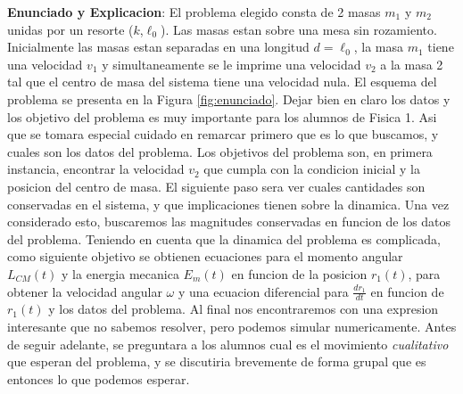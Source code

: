 \documentclass[12pt,a4paper]{article}
\begin{document}
\textbf{Enunciado y Explicacion}: El problema elegido consta de 2 masas $m_1$ y $m_2$ unidas por un resorte ($k$,$\ell_0$). Las masas estan sobre una mesa sin rozamiento. Inicialmente las masas estan separadas en una longitud $d=\ell_0$, la masa $m_1$ tiene una velocidad $v_1$ y simultaneamente se le imprime una velocidad $v_2$ a la masa 2 tal que el centro de masa del sistema tiene una velocidad nula. El esquema del problema se presenta en la Figura \ref{fig:enunciado}. Dejar bien en claro los datos y los objetivo del problema es muy importante para los alumnos de Fisica 1. Asi que se tomara especial cuidado en remarcar primero que es lo que buscamos, y cuales son los datos del problema. Los objetivos del problema son, en primera instancia, encontrar la velocidad $v_2$ que cumpla con la condicion inicial y la posicion del centro de masa. El siguiente paso sera ver cuales cantidades son conservadas en el sistema, y que implicaciones tienen sobre la dinamica. Una vez considerado esto, buscaremos las magnitudes conservadas en funcion de los datos del problema. Teniendo en cuenta que la dinamica del problema es complicada, como siguiente objetivo se obtienen ecuaciones para el momento angular $L_{CM}(t)$ y la energia mecanica $E_m(t)$ en funcion de la posicion $r_1(t)$, para obtener la velocidad angular $\omega$ y una ecuacion diferencial para $\frac{dr_1}{dt}$ en funcion de $r_1(t)$ y los datos del problema. Al final nos encontraremos con una expresion interesante que no sabemos resolver, pero podemos simular numericamente.
Antes de seguir adelante, se preguntara a los alumnos cual es el movimiento \textit{cualitativo} que esperan del problema, y se discutiria brevemente de forma grupal que es entonces lo que podemos esperar.
\end{document}

